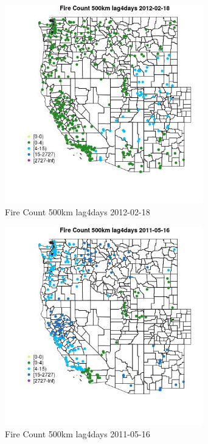 \begin{figure} 
\centering  
\includegraphics[width=0.77\textwidth]{Code_Outputs/Report_ML_input_PM25_Step4_part_f_de_duplicated_aveswNAs_MapObsFire_Count_500km_lag4days2012-02-18.jpg} 
\caption{\label{fig:Report_ML_input_PM25_Step4_part_f_de_duplicated_aveswNAsMapObsFire_Count_500km_lag4days2012-02-18}Fire Count 500km lag4days 2012-02-18} 
\end{figure} 
 

\begin{figure} 
\centering  
\includegraphics[width=0.77\textwidth]{Code_Outputs/Report_ML_input_PM25_Step4_part_f_de_duplicated_aveswNAs_MapObsFire_Count_500km_lag4days2011-05-16.jpg} 
\caption{\label{fig:Report_ML_input_PM25_Step4_part_f_de_duplicated_aveswNAsMapObsFire_Count_500km_lag4days2011-05-16}Fire Count 500km lag4days 2011-05-16} 
\end{figure} 
 

